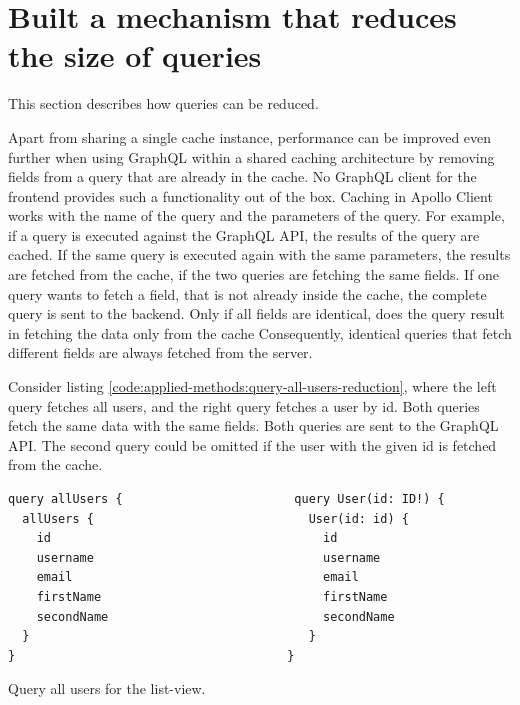 \section{Built a mechanism that reduces the size of queries}\label{section:applied-methods:query-reduction-mechanism}

This section describes how queries can be reduced.

Apart from sharing a single cache instance, performance can be improved even further when using GraphQL within a shared caching architecture by removing fields from a query that are already in the cache. No GraphQL client for the frontend provides such a functionality out of the box. Caching in Apollo Client works with the name of the query and the parameters of the query. For example, if a query is executed against the GraphQL API, the results of the query are cached. If the same query is executed again with the same parameters, the results are fetched from the cache, if the two queries are fetching the same fields. If one query wants to fetch a field, that is not already inside the cache, the complete query is sent to the backend. Only if all fields are identical, does the query result in fetching the data only from the cache Consequently, identical queries that fetch different fields are always fetched from the server.

\bigskip

\noindent Consider listing \ref{code:applied-methods:query-all-users-reduction}, where the left query fetches all users, and the right query fetches a user by id. Both queries fetch the same data with the same fields. Both queries are sent to the GraphQL API. The second query could be omitted if the user with the given id is fetched from the cache. 

\ifshowListings
\begin{listing}[H]
\begin{verbatim}
query allUsers {                        query User(id: ID!) {
  allUsers {                              User(id: id) {
    id                                      id
    username                                username
    email                                   email
    firstName                               firstName
    secondName                              secondName
  }                                       }
}                                      }
\end{verbatim}
\caption{Query all users for the list-view.}\label{code:applied-methods:query-all-users-reduction}
\end{listing}
\fi


